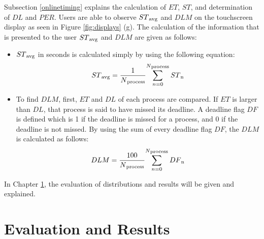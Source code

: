Subsection \ref{onlinetiming} explains the calculation of ${ET}$, ${ST}$, and determination of ${DL}$ and ${PER}$. Users are able to observe ${ST\textsubscript{avg}}$ and ${DLM}$ on the touchscreen display as seen in Figure \ref{fig:displays} (g). The calculation of the information that is presented to the user ${ST\textsubscript{avg}}$ and ${DLM}$ are given as follows:

\begin{itemize}
	\item ${ST\textsubscript{avg}}$ in seconds is calculated simply by using the following equation:
	\begin{equation}
	ST\textsubscript{avg} =  {\frac{1}{N\textsubscript{process}}} {\sum_{n=0}^{N\textsubscript{process}} ST\textsubscript{n}} 
	\end{equation}
	\item To find ${DLM}$, first, ${ET}$ and ${DL}$ of each process are compared. If ${ET}$ is larger than ${DL}$, that process is said to have missed its deadline. A deadline flag ${DF}$ is defined which is 1 if the deadline is missed for a process, and 0 if the deadline is not missed. By using the sum of every deadline flag ${DF}$, the ${DLM}$ is calculated as follows:
	\begin{equation}
	DLM =  {\frac{100}{N\textsubscript{process}}} {\sum_{n=0}^{N\textsubscript{process}} DF\textsubscript{n}} 
	\end{equation}
\end{itemize}
In Chapter \ref{evaluationchapter}, the evaluation of distributions and results will be given and explained.

\chapter{Evaluation and Results}\label{evaluationchapter}
